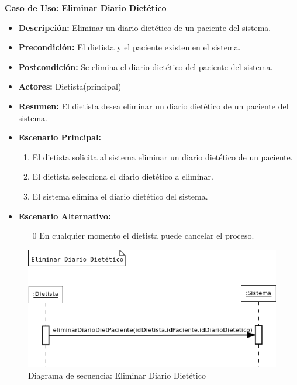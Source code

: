 \textbf{Caso de Uso: Eliminar Diario Dietético}
\begin{itemize}
\item \textbf{Descripción:} Eliminar un diario dietético de un paciente del sistema.
\item \textbf{Precondición:} El dietista y el paciente existen en el sistema.
\item \textbf{Postcondición:} Se elimina el diario dietético del paciente del sistema.
\item \textbf{Actores:} Dietista(principal)
\item \textbf{Resumen:} El dietista desea eliminar un diario dietético de un paciente del sistema.
\item \textbf{Escenario Principal:}
\begin{enumerate}
\item El dietista solicita al sistema eliminar un diario dietético de un paciente.
\item El dietista selecciona el diario dietético a eliminar.
\item El sistema elimina el diario dietético del sistema.
\end{enumerate}
\item \textbf{Escenario Alternativo:}
\begin{enumerate}
\item[0] En cualquier momento el dietista puede cancelar el proceso.
\end{enumerate}
\end{itemize}
\begin{figure}[H]
  \label{ds_eliminardiariodiet}
  \begin{center}
    \includegraphics[scale=0.7]{../img/DS_EliminarDiarioDiet.png}
  \end{center}
  \caption{Diagrama de secuencia: Eliminar Diario Dietético}
\end{figure}
